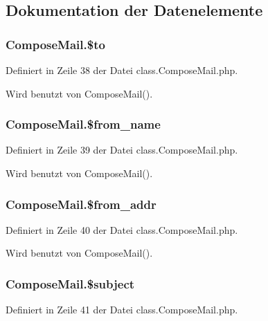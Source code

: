 \subsection{Dokumentation der Datenelemente}
\subsubsection{\setlength{\rightskip}{0pt plus 5cm}ComposeMail.\$to}\label{classComposeMail_7551b7eab0dd3f5820e4f24aa6123edc}




Definiert in Zeile 38 der Datei class.ComposeMail.php.

Wird benutzt von ComposeMail().
\subsubsection{\setlength{\rightskip}{0pt plus 5cm}ComposeMail.\$from\_\-name}\label{classComposeMail_9e66b0a0290df16c9b1cbf6645583f14}




Definiert in Zeile 39 der Datei class.ComposeMail.php.

Wird benutzt von ComposeMail().
\subsubsection{\setlength{\rightskip}{0pt plus 5cm}ComposeMail.\$from\_\-addr}\label{classComposeMail_86a1f76a427c21aac77a1b574203ed5d}




Definiert in Zeile 40 der Datei class.ComposeMail.php.

Wird benutzt von ComposeMail().
\subsubsection{\setlength{\rightskip}{0pt plus 5cm}ComposeMail.\$subject}\label{classComposeMail_dbb16e592ca26487e091b62869c36b9d}




Definiert in Zeile 41 der Datei class.ComposeMail.php.

